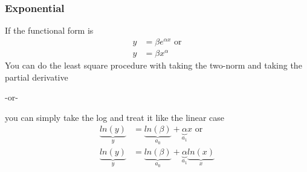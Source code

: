 \documentclass[12pt]{article}
\begin{document}
\subsubsection{Exponential}
If the functional form is
%
\begin{align}
y &= \beta e^{\alpha x} \text{ or}\\
y &= \beta x^{\alpha}
\end{align}
%
You can do the least square procedure with taking the two-norm and taking the partial derivative

-or- 

you can simply take the log and treat it like the linear case
%
\begin{align}
\underbrace{ln(y)}_{y} &= \underbrace{ln(\beta)}_{a_0} + \underbrace{\alpha}_{a_1} x \text{ or}\\
\underbrace{ln(y)}_{y} &= \underbrace{ln(\beta)}_{a_0} + \underbrace{\alpha}_{a_1} \underbrace{ln(x)}_{x}
\end{align}

%
%
%
%



%
% 
\end{document}
